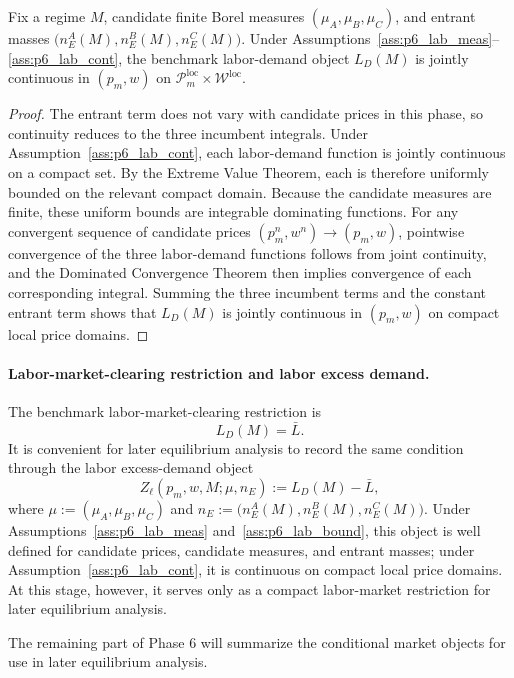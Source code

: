 \begin{proposition}
Fix a regime $M$, candidate finite Borel measures $(\mu_A,\mu_B,\mu_C)$, and entrant masses $\bigl(n_E^A(M),n_E^B(M),n_E^C(M)\bigr)$. Under Assumptions~\ref{ass:p6_lab_meas}--\ref{ass:p6_lab_cont}, the benchmark labor-demand object $L_D(M)$ is jointly continuous in $(p_m,w)$ on $\mathcal P_m^{\mathrm{loc}}\times\mathcal W^{\mathrm{loc}}$.
\end{proposition}

\begin{proof}
The entrant term does not vary with candidate prices in this phase, so continuity reduces to the three incumbent integrals. Under Assumption~\ref{ass:p6_lab_cont}, each labor-demand function is jointly continuous on a compact set. By the Extreme Value Theorem, each is therefore uniformly bounded on the relevant compact domain. Because the candidate measures are finite, these uniform bounds are integrable dominating functions. For any convergent sequence of candidate prices $(p_m^n,w^n)\to(p_m,w)$, pointwise convergence of the three labor-demand functions follows from joint continuity, and the Dominated Convergence Theorem then implies convergence of each corresponding integral. Summing the three incumbent terms and the constant entrant term shows that $L_D(M)$ is jointly continuous in $(p_m,w)$ on compact local price domains.
\end{proof}

\paragraph{Labor-market-clearing restriction and labor excess demand.}
The benchmark labor-market-clearing restriction is
\[
L_D(M)=\bar L.
\]
It is convenient for later equilibrium analysis to record the same condition through the labor excess-demand object
\[
Z_\ell(p_m,w,M;\mu,n_E):=L_D(M)-\bar L,
\]
where $\mu:=(\mu_A,\mu_B,\mu_C)$ and $n_E:=\bigl(n_E^A(M),n_E^B(M),n_E^C(M)\bigr)$. Under Assumptions~\ref{ass:p6_lab_meas} and~\ref{ass:p6_lab_bound}, this object is well defined for candidate prices, candidate measures, and entrant masses; under Assumption~\ref{ass:p6_lab_cont}, it is continuous on compact local price domains. At this stage, however, it serves only as a compact labor-market restriction for later equilibrium analysis.

The remaining part of Phase 6 will summarize the conditional market objects for use in later equilibrium analysis.

